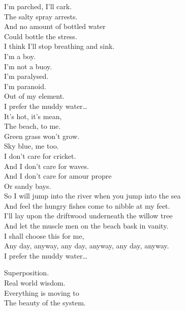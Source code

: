 I'm parched, I'll cark. \\
The salty spray arrests. \\
And no amount of bottled water \\
Could bottle the stress. \\
I think I'll stop breathing and sink. \\
I'm a boy. \\
I'm not a buoy. \\
I'm paralysed. \\
I'm paranoid. \\
Out of my element. \\

I prefer the muddy water… \\

It's hot, it's mean, \\
The beach, to me. \\
Green grass won't grow. \\
Sky blue, me too. \\

I don't care for cricket. \\
And I don't care for waves. \\
And I don't care for amour propre \\
Or sandy bays. \\

So I will jump into the river when you jump into the sea \\
And feel the hungry fishes come to nibble at my feet. \\
I'll lay upon the driftwood underneath the willow tree \\
And let the muscle men on the beach bask in vanity. \\

I shall choose this  for me, \\
Any day, anyway, any day, anyway, any day, anyway. \\

I prefer the muddy water… \\





Superposition. \\
Real world wisdom. \\
Everything is moving to \\
The beauty of the system. \\

